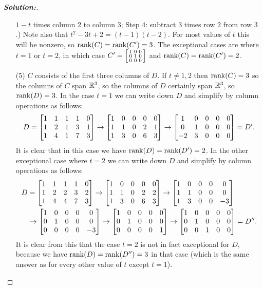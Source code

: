 \documentclass[a4paper]{amsart}
\theoremstyle{definition}
\newenvironment{solution}{\begin{proof}[\textbf{Solution:}] \vphantom{u}}{\end{proof}}
\begin{document}
\begin{solution}
\begin{itemize}
   $1-t$ times column $2$ to column $3$; Step $4$: subtract $3$ times
   row $2$ from row $3$.)  Note also that $t^2-3t+2=(t-1)(t-2)$.  For
   most values of $t$ this will be nonzero, so $\rnk(C)=\rnk(C')=3$.
   The exceptional cases are where $t=1$ or $t=2$, in which case
   $C'=\bsm 1&0&0 \\ 0&1&0\\ 0&0&0\esm$ and $\rnk(C)=\rnk(C')=2$.
  \item[(5)] $C$ consists of the first three columns of $D$.  If
   $t\neq 1,2$ then $\operatorname{rank}(C)=3$ so the columns of $C$ span ${\mathbb{R}}^3$, so
   the columns of $D$ certainly span ${\mathbb{R}}^3$, so $\operatorname{rank}(D)=3$.  In the
   case $t=1$ we can write down $D$ and simplify by column operations
   as follows:
   \[ D = \left[\begin{matrix} 1 & 1 & 1 & 1 & 0 \\
               1 & 2 & 1 & 3 & 1 \\
               1 & 4 & 1 & 7 & 3 \end{matrix}\right] \to
          \left[\begin{matrix} 1 & 0 & 0 & 0 & 0 \\
               1 & 1 & 0 & 2 & 1 \\
               1 & 3 & 0 & 6 & 3 \end{matrix}\right] \to
          \left[\begin{matrix} 1 & 0 & 0 & 0 & 0 \\
               0 & 1 & 0 & 0 & 0 \\
              -2 & 3 & 0 & 0 & 0 \end{matrix}\right]
        = D'.
   \]
   It is clear that in this case we have $\operatorname{rank}(D)=\operatorname{rank}(D')=2$.  In the
   other exceptional case where $t=2$ we can write down $D$ and
   simplify by column operations as follows:
   \begin{align*}
   D &= \left[\begin{matrix} 1 & 1 & 1 & 1 & 0 \\
               1 & 2 & 2 & 3 & 2 \\
               1 & 4 & 4 & 7 & 3 \end{matrix}\right] \to
          \left[\begin{matrix} 1 & 0 & 0 & 0 & 0 \\
               1 & 1 & 0 & 2 & 2 \\
               1 & 3 & 0 & 6 & 3 \end{matrix}\right] \to
          \left[\begin{matrix} 1 & 0 & 0 & 0 & 0 \\
               1 & 1 & 0 & 0 & 0 \\
               1 & 3 & 0 & 0 &-3 \end{matrix}\right] \\
    & \to
          \left[\begin{matrix} 1 & 0 & 0 & 0 & 0 \\
               0 & 1 & 0 & 0 & 0 \\
               0 & 0 & 0 & 0 &-3 \end{matrix}\right] \to
          \left[\begin{matrix} 1 & 0 & 0 & 0 & 0 \\
               0 & 1 & 0 & 0 & 0 \\
               0 & 0 & 0 & 0 & 1 \end{matrix}\right] \to
          \left[\begin{matrix} 1 & 0 & 0 & 0 & 0 \\
               0 & 1 & 0 & 0 & 0 \\
               0 & 0 & 1 & 0 & 0 \end{matrix}\right]
        = D''.
   \end{align*}
   It is clear from this that the case $t=2$ is not in fact
   exceptional for $D$, because we have $\operatorname{rank}(D)=\operatorname{rank}(D'')=3$ in that
   case (which is the same answer as for every other value of $t$
   except $t=1$).
 \end{itemize}
\end{solution}
\end{document}
